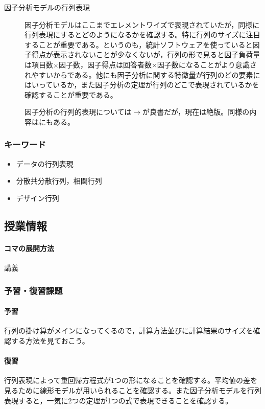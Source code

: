 \begin{description}
    \item[因子分析モデルの行列表現]因子分析モデルはここまでエレメントワイズで表現されていたが，同様に行列表現にするとどのようになるかを確認する。特に行列のサイズに注目することが重要である。というのも，統計ソフトウェアを使っていると因子得点が表示されないことが少なくないが，行列の形で見ると因子負荷量は項目数$\times$因子数，因子得点は回答者数$\times$因子数になることがより意識されやすいからである。他にも因子分析に関する特徴量が行列のどの要素にはいっているか，また因子分析の定理が行列のどこで表現されているかを確認することが重要である。
    \begin{flushright}
        因子分析の行列的表現については$\to$\citet{芝祐順1979-01}が良書だが，現在は絶版。同様の内容は\citet{kosugi2018}にもある。
    \end{flushright}
\end{description}
\subsubsection{キーワード}
\begin{itemize}
\item データの行列表現
\item 分散共分散行列，相関行列
\item デザイン行列
\end{itemize}
\subsection{授業情報}
\paragraph{コマの展開方法}
講義
\subsubsection{予習・復習課題}
\paragraph{予習}行列の掛け算がメインになってくるので，計算方法並びに計算結果のサイズを確認する方法を見ておこう。
\paragraph{復習}行列表現によって重回帰方程式が1つの形になることを確認する。平均値の差を見るために線形モデルが用いられることを確認する。また因子分析モデルを行列表現すると，一気に2つの定理が1つの式で表現できることを確認する。
